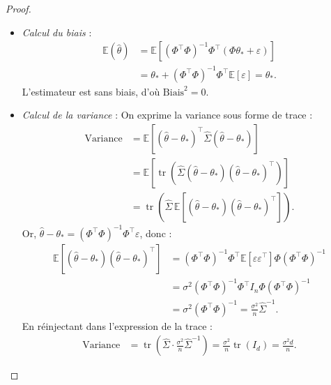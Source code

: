 \begin{proof}
    \begin{itemize}
        \item \emph{Calcul du biais} : 
        \begin{align*}
            \mathbb{E}(\hat{\theta}) &= \mathbb{E}\left[ (\Phi^\top \Phi)^{-1} \Phi^\top (\Phi \theta_* + \varepsilon) \right] \\
            &= \theta_* + (\Phi^\top \Phi)^{-1} \Phi^\top \mathbb{E}[\varepsilon] = \theta_*.
        \end{align*}
        L'estimateur est sans biais, d'où $\text{Biais}^2 = 0$.

        \item \emph{Calcul de la variance} : On exprime la variance sous forme de trace :
        \begin{align*}
            \text{Variance} &= \mathbb{E}\left[ (\hat{\theta} - \theta_*)^\top \hat{\Sigma} (\hat{\theta} - \theta_*) \right] \\
            &= \mathbb{E}\left[ \operatorname{tr}\left( \hat{\Sigma} (\hat{\theta} - \theta_*) (\hat{\theta} - \theta_*)^\top \right) \right] \\
            &= \operatorname{tr}\left( \hat{\Sigma} \, \mathbb{E}\left[ (\hat{\theta} - \theta_*) (\hat{\theta} - \theta_*)^\top \right] \right).
        \end{align*}
        Or, $\hat{\theta} - \theta_* = (\Phi^\top \Phi)^{-1} \Phi^\top \varepsilon$, donc :
        \begin{align*}
            \mathbb{E}\left[ (\hat{\theta} - \theta_*) (\hat{\theta} - \theta_*)^\top \right] &= (\Phi^\top \Phi)^{-1} \Phi^\top \mathbb{E}[\varepsilon \varepsilon^\top] \Phi (\Phi^\top \Phi)^{-1} \\
            &= \sigma^2 (\Phi^\top \Phi)^{-1} \Phi^\top I_n \Phi (\Phi^\top \Phi)^{-1} \\
            &= \sigma^2 (\Phi^\top \Phi)^{-1} = \frac{\sigma^2}{n} \hat{\Sigma}^{-1}.
        \end{align*}
        En réinjectant dans l'expression de la trace :
        \begin{align*}
            \text{Variance} &= \operatorname{tr}\left( \hat{\Sigma} \cdot \frac{\sigma^2}{n} \hat{\Sigma}^{-1} \right) = \frac{\sigma^2}{n} \operatorname{tr}(I_d) = \frac{\sigma^2 d}{n}.
        \end{align*}
    \end{itemize}
\end{proof}

